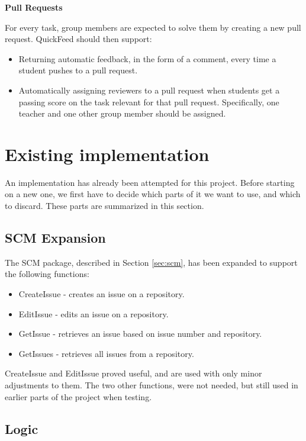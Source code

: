 \textbf{Pull Requests}

For every task, group members are expected to solve them by creating a new pull request.
QuickFeed should then support:
\begin{itemize}
    \item Returning automatic feedback, in the form of a comment, every time a student pushes to a pull request.
    \item Automatically assigning reviewers to a pull request when students get a passing score on the task relevant for that pull request.
    Specifically, one teacher and one other group member should be assigned.
\end{itemize}

\section{Existing implementation}

An implementation has already been attempted for this project.
Before starting on a new one, we first have to decide which parts of it we want to use, and which to discard.
These parts are summarized in this section.

\subsection{SCM Expansion}
\label{sec:scm_expansion}

The SCM package, described in Section \ref{sec:scm}, has been expanded to support the following functions:

\begin{itemize}
    \item CreateIssue   - creates an issue on a repository.
    \item EditIssue - edits an issue on a repository.
    \item GetIssue  - retrieves an issue based on issue number and repository.
    \item GetIssues - retrieves all issues from a repository.
\end{itemize}

CreateIssue and EditIssue proved useful, and are used with only minor adjustments to them.
The two other functions, were not needed, but still used in earlier parts of the project when testing.

\subsection{Logic}

